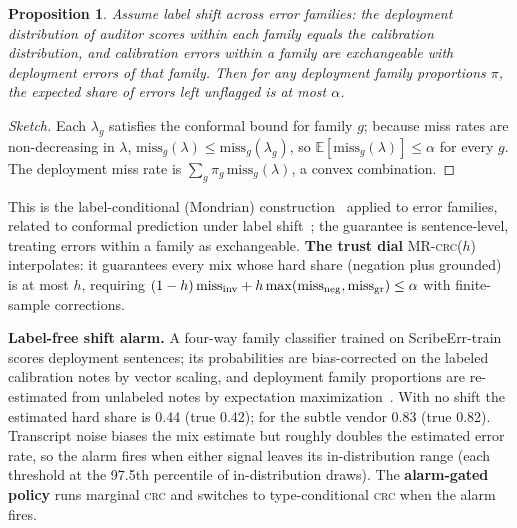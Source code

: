 \documentclass[10pt,twocolumn]{article}
\newtheorem{proposition}{Proposition}
\newcommand{\crc}{\textsc{crc}}
\begin{document}
\begin{proposition}
Assume label shift across error families: the deployment distribution of auditor scores within each family equals the calibration distribution, and calibration errors within a family are exchangeable with deployment errors of that family. Then for any deployment family proportions $\pi$, the expected share of errors left unflagged is at most $\alpha$.
\end{proposition}
\begin{proof}[Sketch]
Each $\lambda_g$ satisfies the conformal bound for family $g$; because miss rates are non-decreasing in $\lambda$, $\mathrm{miss}_g(\lambda)\le\mathrm{miss}_g(\lambda_g)$, so $\mathbb E[\mathrm{miss}_g(\lambda)]\le\alpha$ for every $g$. The deployment miss rate is $\sum_g\pi_g\,\mathrm{miss}_g(\lambda)$, a convex combination.
\end{proof}
This is the label-conditional (Mondrian) construction~\citep{vovk2005algorithmic} applied to error families, related to conformal prediction under label shift~\citep{podkopaev2021label}; the guarantee is sentence-level, treating errors within a family as exchangeable. \textbf{The trust dial} MR-\crc($h$) interpolates: it guarantees every mix whose hard share (negation plus grounded) is at most $h$, requiring $(1-h)\,\mathrm{miss}_{\rm inv}+h\max(\mathrm{miss}_{\rm neg},\mathrm{miss}_{\rm gr})\le\alpha$ with finite-sample corrections.

\textbf{Label-free shift alarm.} A four-way family classifier trained on ScribeErr-train scores deployment sentences; its probabilities are bias-corrected on the labeled calibration notes by vector scaling, and deployment family proportions are re-estimated from unlabeled notes by expectation maximization~\citep{saerens2002adjusting,alexandari2020maximum}. With no shift the estimated hard share is 0.44 (true 0.42); for the subtle vendor 0.83 (true 0.82). Transcript noise biases the mix estimate but roughly doubles the estimated error rate, so the alarm fires when either signal leaves its in-distribution range (each threshold at the 97.5th percentile of in-distribution draws). The \textbf{alarm-gated policy} runs marginal \crc{} and switches to type-conditional \crc{} when the alarm fires.
\end{document}
